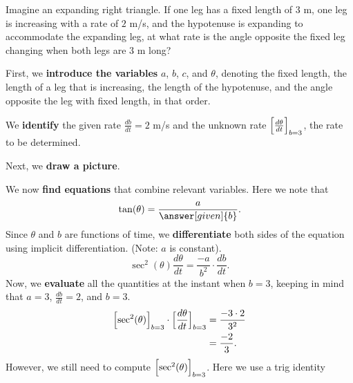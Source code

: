 \documentclass{ximera}
\begin{document}
\begin{example}
  Imagine an expanding right triangle. If one leg has a fixed length
  of $3$ m, one leg is increasing with a rate of $2$ m/s, and the
  hypotenuse is expanding to accommodate the expanding leg, at what
  rate is the angle opposite the fixed leg changing when both legs
  are $3$ m long?
  \begin{explanation}
  First, we \textbf{introduce the variables}  $a$, $b$, $c$, and $\theta$, denoting the fixed length, the length of a leg that is increasing, 
  the length of the hypotenuse, and the angle opposite the leg with fixed length,  in that order. 
  
  
  We \textbf{identify} the given rate $\frac{db}{dt}=2$ m/s and the unknown rate $\Bigl[\frac{d\theta}{dt}\Bigr]_{b=3}$, the rate to be determined.
  
  
    Next, we \textbf{draw a picture}.
    \begin{image}
    \end{image} 

    We now \textbf{find equations} that combine relevant
    variables. Here we note that
    \[
    \tan(\theta) = \frac{a}{\answer[given]{b}}.
    \]
    Since $\theta$ and $b$ are functions of time, we
      \textbf{differentiate}  both sides of  the equation using
    implicit differentiation.
  (Note: $a$ is constant).
    \[
    \sec^2(\theta)\frac{d\theta}{dt} = \frac{-a}{b^2}\cdot \frac{db}{dt}.
    \]
    Now, we \textbf{evaluate} all the quantities at the instant when $b=3$, keeping in mind that
     $a=3$, $\frac{db}{dt} = 2$, and $b = 3$.
    \begin{align*}
    \Bigl[\sec^2(\theta)\Bigr]_{b=3}\cdot \Bigl[\dfrac{d\theta}{dt}\Bigr]_{b=3} &= \frac{-3\cdot 2}{3^2}\\
    &= \frac{-2}{3}.
    \end{align*}
    However, we still need to compute $ \Bigl[\sec^2(\theta)\Bigr]_{b=3}$. Here we use a trig identity
  

\end{explanation}
\end{example}
\end{document}

